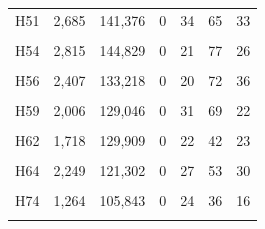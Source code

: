 \documentclass[
  a4paper,
  titlepage]{article}
\begin{document}
\begin{longtable}[t]{lllllll}
H51 & 2,685 & 141,376 & 0 & 34 & 65 & 33\\
 
\cellcolor{gray!6}{H52} & \cellcolor{gray!6}{2,889} & \cellcolor{gray!6}{161,502} & \cellcolor{gray!6}{0} & \cellcolor{gray!6}{27} & \cellcolor{gray!6}{81} & \cellcolor{gray!6}{42}\\
 
H54 & 2,815 & 144,829 & 0 & 21 & 77 & 26\\
 
\cellcolor{gray!6}{H55} & \cellcolor{gray!6}{2,606} & \cellcolor{gray!6}{157,248} & \cellcolor{gray!6}{0} & \cellcolor{gray!6}{43} & \cellcolor{gray!6}{68} & \cellcolor{gray!6}{35}\\
 
H56 & 2,407 & 133,218 & 0 & 20 & 72 & 36\\
 
\cellcolor{gray!6}{H58} & \cellcolor{gray!6}{2,169} & \cellcolor{gray!6}{124,347} & \cellcolor{gray!6}{0} & \cellcolor{gray!6}{29} & \cellcolor{gray!6}{45} & \cellcolor{gray!6}{20}\\
 
H59 & 2,006 & 129,046 & 0 & 31 & 69 & 22\\
 
\cellcolor{gray!6}{H61} & \cellcolor{gray!6}{2,387} & \cellcolor{gray!6}{122,889} & \cellcolor{gray!6}{0} & \cellcolor{gray!6}{25} & \cellcolor{gray!6}{66} & \cellcolor{gray!6}{37}\\
 
H62 & 1,718 & 129,909 & 0 & 22 & 42 & 23\\
 
\cellcolor{gray!6}{H63} & \cellcolor{gray!6}{3,024} & \cellcolor{gray!6}{161,393} & \cellcolor{gray!6}{0} & \cellcolor{gray!6}{36} & \cellcolor{gray!6}{80} & \cellcolor{gray!6}{50}\\
 
H64 & 2,249 & 121,302 & 0 & 27 & 53 & 30\\
 
\cellcolor{gray!6}{H70} & \cellcolor{gray!6}{2,984} & \cellcolor{gray!6}{164,361} & \cellcolor{gray!6}{0} & \cellcolor{gray!6}{43} & \cellcolor{gray!6}{76} & \cellcolor{gray!6}{39}\\
 
H74 & 1,264 & 105,843 & 0 & 24 & 36 & 16\\
 
\cellcolor{gray!6}{H76} & \cellcolor{gray!6}{2,485} & \cellcolor{gray!6}{131,293} & \cellcolor{gray!6}{0} & \cellcolor{gray!6}{37} & \cellcolor{gray!6}{66} & \cellcolor{gray!6}{33}\\
 

\end{longtable}
\end{document}
